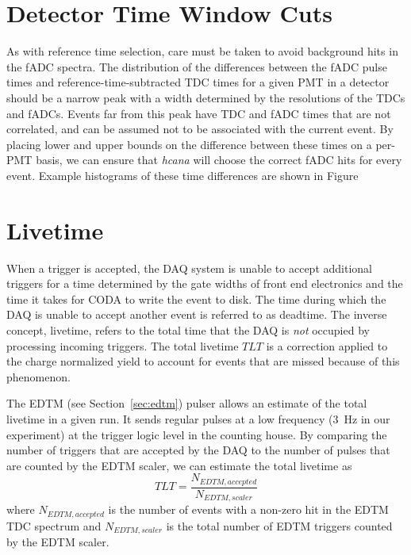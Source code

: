 \section{Detector Time Window Cuts}
As with reference time selection, care must be taken to avoid background hits
in the fADC spectra.
The distribution of the differences between the fADC pulse times and
reference-time-subtracted TDC times for a given PMT in a detector should
be a narrow peak with a width determined by the resolutions of the TDCs
and fADCs.
Events far from this peak have TDC and fADC times that are not correlated, and
can be assumed not to be associated with the current event.
By placing lower and upper bounds on the difference between these times on a
per-PMT basis, we can ensure that \textit{hcana} will choose the correct fADC
hits for every event.
Example histograms of these time differences are shown in Figure


\section{Livetime} \label{sec:livetime}
When a trigger is accepted, the DAQ system is unable to accept additional
triggers for a time determined by the gate widths of front end electronics and
the time it takes for CODA to write the event to disk.
The time during which the DAQ is unable to accept another event is referred to
as deadtime.
The inverse concept, livetime, refers to the total time that the DAQ is
\textit{not} occupied by processing incoming triggers.
The total livetime $TLT$ is a correction applied to the charge normalized yield
to account for events that are missed because of this phenomenon.


The EDTM (see Section~\ref{sec:edtm}) pulser allows an estimate of the total
livetime in a given run.
It sends regular pulses at a low frequency (\SI{3}{\hertz} in our experiment) at the
trigger logic level in the counting house.
By comparing the number of triggers that are accepted by the DAQ to the number
of pulses that are counted by the EDTM scaler, we can estimate the total
livetime as
\begin{equation}
    TLT = \frac{N_{EDTM,accepted}}{N_{EDTM,scaler}}
\end{equation}
where $N_{EDTM,accepted}$ is the number of events with a non-zero hit in the
EDTM TDC spectrum and $N_{EDTM,scaler}$ is the total number of EDTM triggers
counted by the EDTM scaler.


